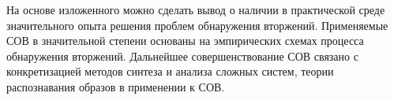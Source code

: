 На основе изложенного можно сделать вывод о наличии в практической среде значительного опыта 
решения проблем обнаружения вторжений. Применяемые СОВ в значительной степени основаны на 
эмпирических схемах процесса обнаружения вторжений. Дальнейшее совершенствование СОВ связано 
с конкретизацией методов синтеза и анализа сложных систем, теории распознавания образов в 
применении к СОВ.